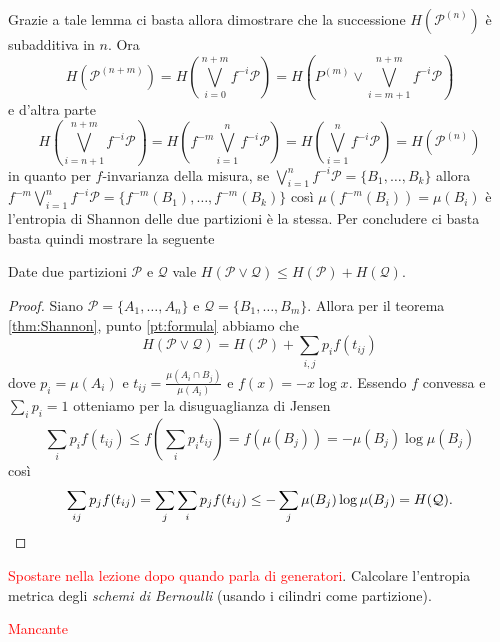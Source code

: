 Grazie a tale lemma ci basta allora dimostrare che la successione $ H(\mathcal{P}^{(n)}) $ è subadditiva in $ n $. Ora
\[ H(\mathcal{P}^{(n+m)}) = H\left(\bigvee_{i=0}^{n+m}f^{-i}\mathcal{P}\right) = H\left(P^{(m)} \vee \bigvee_{i=m+1}^{n+m}f^{-i}\mathcal{P}\right) \]
e d'altra parte
\[ H\left(\bigvee_{i=n+1}^{n+m}f^{-i}\mathcal{P}\right) = H\left(f^{-m}\bigvee_{i=1}^{n}f^{-i}\mathcal{P}\right) = H\left(\bigvee_{i=1}^{n}f^{-i}\mathcal{P}\right) = H(\mathcal{P}^{(n)}) \]
in quanto per $ f $-invarianza della misura, se $ \bigvee_{i=1}^{n}f^{-i}\mathcal{P} = \{B_1, \ldots, B_k\} $ allora $ f^{-m}\bigvee_{i=1}^{n}f^{-i}\mathcal{P} = \{f^{-m}(B_1), \ldots, f^{-m}(B_k)\} $ così $ \mu(f^{-m}(B_i)) = \mu(B_i) $ è l'entropia di Shannon delle due partizioni è la stessa. Per concludere ci basta basta quindi mostrare la seguente

\begin{proposition}
    Date due partizioni $ \mathcal{P} $ e $ \mathcal{Q} $ vale $ H(\mathcal{P} \vee \mathcal{Q}) \leq H(\mathcal{P}) + H(\mathcal{Q}) $.
\end{proposition}
\begin{proof}
    Siano $ \mathcal{P} = \{A_1, \ldots, A_n\} $ e $ \mathcal{Q} = \{B_1, \ldots, B_m\} $. Allora per il teorema \ref{thm:Shannon}, punto \ref{pt:formula} abbiamo che
    \[ H(\mathcal{P} \vee \mathcal{Q}) = H(\mathcal{P}) + \sum_{i, j} p_i f(t_{ij}) \]
    dove $ p_i = \mu(A_i) $ e $ t_{ij} = \frac{\mu(A_i \cap B_j)}{\mu(A_i)} $ e $ f(x) = - x \log{x} $. Essendo $ f $ convessa e $ \sum_{i} p_i = 1 $ otteniamo per la disuguaglianza di Jensen
    \[ \sum_{i} p_i f(t_{ij}) \leq f\left(\sum_{i} p_i t_{ij}\right) = f(\mu(B_j)) = - \mu(B_j) \log{\mu(B_j)} \]
    così
    \[ \sum_{ij} p_j f(t_{ij}) = \sum_{j} \sum_{i} p_j f(t_{ij}) \leq - \sum_{j} \mu(B_j) \log{\mu(B_j)} = H(\mathcal{Q}). \qedhere \]
\end{proof}

\begin{exercise}
    \textcolor{red}{Spostare nella lezione dopo quando parla di generatori}.
    Calcolare l'entropia metrica degli \emph{schemi di Bernoulli} (usando i cilindri come partizione).
\end{exercise}
\begin{solution}
    \textcolor{red}{Mancante}
\end{solution}
